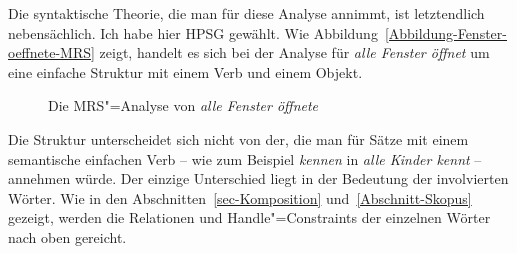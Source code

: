 Die syntaktische Theorie, die man für diese Analyse annimmt, ist letztendlich nebensächlich. Ich habe
hier HPSG gewählt. Wie Abbildung~\vref{Abbildung-Fenster-oeffnete-MRS} zeigt, handelt es sich bei der
Analyse für \emph{alle Fenster öffnet} um eine einfache Struktur mit einem Verb und einem Objekt.
\begin{figure}
\caption{\label{Abbildung-Fenster-oeffnete-MRS}Die MRS"=Analyse von \emph{alle Fenster öffnete}}
\end{figure}
Die Struktur unterscheidet sich nicht von der, die man für Sätze mit einem semantische einfachen
Verb -- wie zum Beispiel \emph{kennen} in \emph{alle Kinder kennt} -- annehmen würde. Der einzige
Unterschied liegt in der Bedeutung der involvierten Wörter.  Wie in den
Abschnitten~\ref{sec-Komposition} und~\ref{Abschnitt-Skopus} gezeigt, werden die Relationen und
Handle"=Constraints der einzelnen Wörter nach oben gereicht. 

